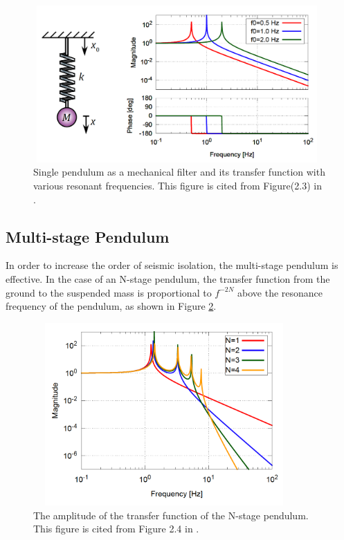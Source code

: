 \begin{figure}[h]
  \begin{center}   
    \includegraphics[width=11cm,height=6cm]{./img_chap5/img501.png}
    \caption{Single pendulum as a mechanical filter and its transfer function with various resonant frequencies. This figure is cited from Figure(2.3) in \cite{sekiguchi2016astudy}.} \label{img:img501}
  \end{center}
\end{figure}

\subsection{Multi-stage Pendulum}
In order to increase the order of seismic isolation, the multi-stage pendulum is effective. In the case of an N-stage pendulum, the transfer function from the ground to the suspended mass is proportional to $f^{-2N}$ above the resonance frequency of the pendulum, as shown in Figure \ref{img:img502}. 
\begin{figure}[h]
  \begin{center}   
    \includegraphics[width=10cm,height=7cm]{./img_chap5/img502.png}
    \caption{The amplitude of the transfer function of the N-stage pendulum. This figure is cited from Figure 2.4 in \cite{sekiguchi2016astudy}.} \label{img:img502}
  \end{center}
\end{figure}


